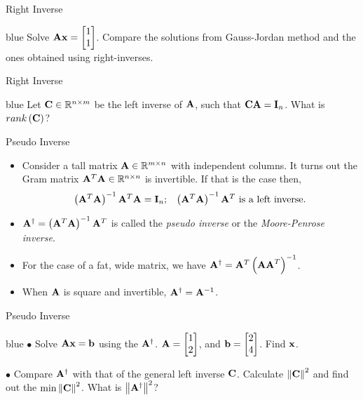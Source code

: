 \documentclass[aspectratio=169]{beamer}
\let\olditem\item
\renewcommand{\item}{\setlength{\itemsep}{\fill}\olditem}
\def\mf{\ensuremath\mathbf}
\def\mb{\ensuremath\mathbb}
\def\lp{\ensuremath\left(}
\def\rp{\ensuremath\right)}
\def\lV{\ensuremath\left\lVert}
\def\rV{\ensuremath\right\rVert}
\begin{document}
\begin{frame}[t]{Right Inverse}
\begin{color}{blue}
    Solve $\mf{A}\mf{x} = \begin{bmatrix*}[r]1 \\ 1\end{bmatrix*}$. Compare the solutions from Gauss-Jordan method and the ones obtained using right-inverses.
\end{color}
\end{frame}


\begin{frame}[t]{Right Inverse}
\begin{color}{blue}
    Let $\mf{C} \in \mb{R}^{n \times m}$ be the left inverse of $\mf{A}$, such that $\mf{C}\mf{A} = \mf{I}_n$. What is $rank\lp\mf{C}\rp$? 
\end{color}
\end{frame}

\begin{frame}[t]{Pseudo Inverse}
\begin{itemize}
    \item Consider a tall matrix $\mf{A} \in \mb{R}^{m \times n}$ with independent columns. It turns out the Gram matrix $\mf{A}^T\mf{A} \in \mb{R}^{n \times n}$ is invertible. If that is the case then,
    \[ \left(\mf{A}^T\mf{A}\right)^{-1}\mf{A}^T\mf{A} = \mf{I}_n; \,\,\,\,\, \left(\mf{A}^T\mf{A}\right)^{-1}\mf{A}^T \text{ is a left inverse.} \]
    \item $\mf{A}^{\dagger} = \left(\mf{A}^T\mf{A}\right)^{-1}\mf{A}^T$ is called the \textit{pseudo inverse} or the \textit{Moore-Penrose inverse}.

    \item For the case of a fat, wide matrix, we have $\mf{A}^{\dagger} = \mf{A}^T\left(\mf{AA}^T\right)^{-1}$.

    \item When $\mf{A}$ is square and invertible, $\mf{A}^{\dagger} = \mf{A}^{-1}$.
\end{itemize}
\end{frame}


\begin{frame}[t]{Pseudo Inverse}
\begin{color}{blue}
    $\bullet$ Solve $\mf{Ax} = \mf{b}$ using the $\mf{A}^\dagger$. $\mf{A} = \begin{bmatrix*}[r]1\\2\end{bmatrix*}$, and $\mf{b} = \begin{bmatrix*}2\\4\end{bmatrix*}$. Find $\mf{x}$.\\
    \vspace{2cm}

    $\bullet$ Compare $\mf{A}^\dagger$ with that of the general left inverse $\mf{C}$. Calculate $\lV \mf{C} \rV^2$ and find out the $\min \lV\mf{C}\rV^2$. What is $\lV\mf{A}^\dagger\rV^2$?
\end{color}
\end{frame}
\end{document}
